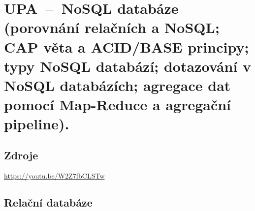 

\graphicspath{{upa/nosql/figures}}


\chapter{UPA~--~NoSQL databáze (porovnání relačních a NoSQL; CAP věta a ACID/BASE principy; typy NoSQL databází; dotazování v NoSQL databázích; agregace dat pomocí Map-Reduce a agregační pipeline).}


\section{Zdroje}

\begin{compactitem}
    \item {}
    \item {}
    \item {}
    \item \url{https://youtu.be/W2Z7fbCLSTw}
\end{compactitem}


\section{Relační databáze}

